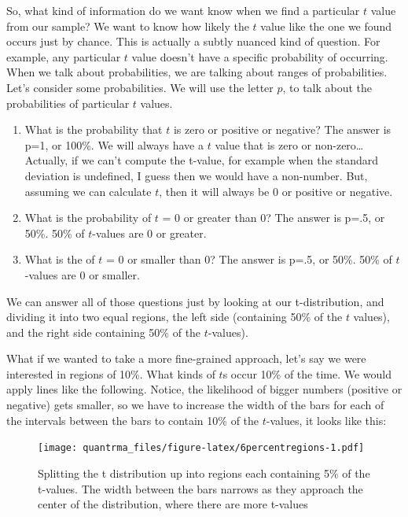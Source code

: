 \documentclass[
]{book}
\begin{document}
So, what kind of information do we want know when we find a particular \(t\) value from our sample? We want to know how likely the \(t\) value like the one we found occurs just by chance. This is actually a subtly nuanced kind of question. For example, any particular \(t\) value doesn't have a specific probability of occurring. When we talk about probabilities, we are talking about ranges of probabilities. Let's consider some probabilities. We will use the letter \(p\), to talk about the probabilities of particular \(t\) values.

\begin{enumerate}
\def\labelenumi{\arabic{enumi}.}
\item
  What is the probability that \(t\) is zero or positive or negative? The answer is p=1, or 100\%. We will always have a \(t\) value that is zero or non-zero\ldots Actually, if we can't compute the t-value, for example when the standard deviation is undefined, I guess then we would have a non-number. But, assuming we can calculate \(t\), then it will always be 0 or positive or negative.
\item
  What is the probability of \(t\) = 0 or greater than 0? The answer is p=.5, or 50\%. 50\% of \(t\)-values are 0 or greater.
\item
  What is the of \(t\) = 0 or smaller than 0? The answer is p=.5, or 50\%. 50\% of \(t\)-values are 0 or smaller.
\end{enumerate}

We can answer all of those questions just by looking at our t-distribution, and dividing it into two equal regions, the left side (containing 50\% of the \(t\) values), and the right side containing 50\% of the \(t\)-values).

What if we wanted to take a more fine-grained approach, let's say we were interested in regions of 10\%. What kinds of \(t\)s occur 10\% of the time. We would apply lines like the following. Notice, the likelihood of bigger numbers (positive or negative) gets smaller, so we have to increase the width of the bars for each of the intervals between the bars to contain 10\% of the \(t\)-values, it looks like this:

\begin{figure}
\centering
\texttt{[image: quantrma\_files/figure-latex/6percentregions-1.pdf]}
\caption{\label{fig:6percentregions}Splitting the t distribution up into regions each containing 5\% of the t-values. The width between the bars narrows as they approach the center of the distribution, where there are more t-values}
\end{figure}
\end{document}
